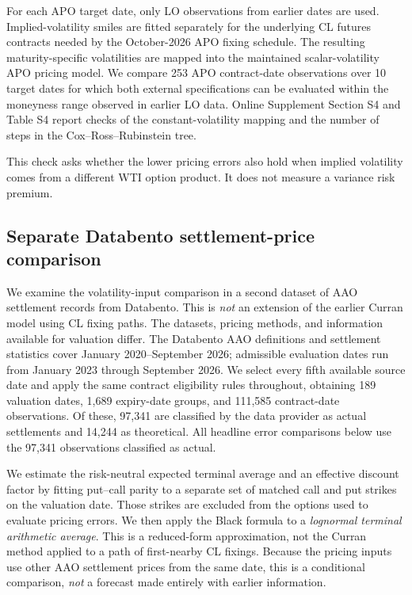 For each APO target date, only LO observations from earlier dates are used. Implied-volatility smiles are fitted separately for the underlying CL futures contracts needed by the October-2026 APO fixing schedule. The resulting maturity-specific volatilities are mapped into the maintained scalar-volatility APO pricing model. We compare 253 APO contract-date observations over 10 target dates for which both external specifications can be evaluated within the moneyness range observed in earlier LO data. Online Supplement Section S4 and Table S4 report checks of the constant-volatility mapping and the number of steps in the Cox--Ross--Rubinstein tree.

This check asks whether the lower pricing errors also hold when implied volatility comes from a different WTI option product. It does not measure a variance risk premium.


\subsection{Separate Databento settlement-price comparison}

We examine the volatility-input comparison in a second dataset of
AAO settlement records from Databento. This is \emph{not} an extension
of the earlier Curran model using CL fixing paths. The datasets,
pricing methods, and information available for valuation differ. The Databento AAO
definitions and settlement statistics cover January 2020--September
2026; admissible evaluation dates run from January 2023 through
September 2026. We select every fifth available source date and apply the same
contract eligibility rules throughout, obtaining 189 valuation dates,
1,689 expiry-date groups, and 111,585 contract-date observations. Of these,
97,341 are classified by the data provider as actual
settlements and 14,244 as theoretical. All headline
error comparisons below use the 97,341 observations
classified as actual.

We estimate the risk-neutral expected terminal average and an
effective discount factor by fitting put--call parity to a separate
set of matched call and put strikes on the valuation date. Those
strikes are excluded from the options used to evaluate pricing errors. We then apply the Black formula to a \emph{lognormal terminal
arithmetic average}. This is a reduced-form approximation, not
the Curran method applied to a path of first-nearby CL fixings. Because the pricing inputs use other AAO settlement prices from
the same date, this is a conditional comparison, \emph{not} a
forecast made entirely with earlier information.

